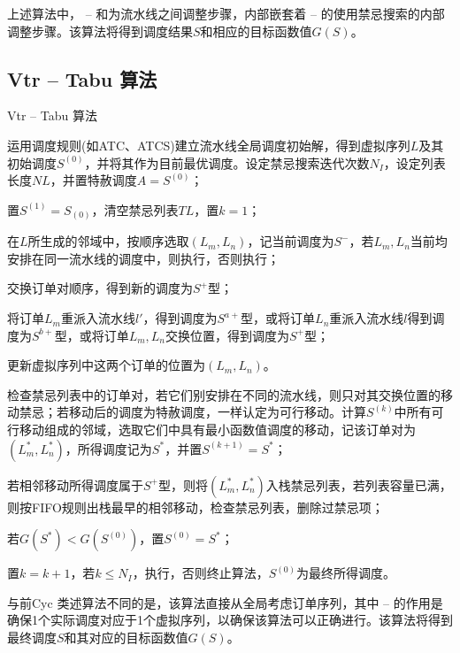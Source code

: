 上述算法中， --  和为流水线之间调整步骤，内部嵌套着 -- 的使用禁忌搜索的内部调整步骤。该算法将得到调度结果$S$和相应的目标函数值$G(S)$。
\subsection{Vtr -- Tabu 算法}
\begin{algori}
Vtr -- Tabu 算法\label{alg:vtrtabu}
\begin{asparaenum}
\renewcommand{\labelenumi}{\bf Step\theenumi~}
\item 运用调度规则(如ATC、ATCS)建立流水线全局调度初始解，得到虚拟序列$L$及其初始调度$S^{(0)}$，并将其作为目前最优调度。设定禁忌搜索迭代次数$N_I$，设定列表长度$NL$，并置特赦调度$A = S^{(0)}$；
\item 置$S^{(1)} = S_{(0)}$，清空禁忌列表$TL$，置$k = 1$；
\item 在$L$所生成的邻域中，按顺序选取$(L_m, L_n)$，记当前调度为$S^-$，若$L_m, L_n$当前均安排在同一流水线的调度中，则执行，否则执行；
\item 交换订单对顺序，得到新的调度为$S^+$型；
\item 将订单$L_m$重派入流水线$l'$，得到调度为$S^{a+}$型，或将订单$L_n$重派入流水线$l$得到调度为$S^{b+}$型，或将订单$L_m, L_n$交换位置，得到调度为$S^+$型；
\item 更新虚拟序列中这两个订单的位置为$(L_m, L_n)$。
\item 检查禁忌列表中的订单对，若它们别安排在不同的流水线，则只对其交换位置的移动禁忌；若移动后的调度为特赦调度，一样认定为可行移动。计算$S^{(k)}$中所有可行移动组成的邻域，选取它们中具有最小函数值调度的移动，记该订单对为$(L_m^*, L_n^*)$，所得调度记为$S^*$，并置$S^{(k+1)} = S^*$；
\item 若相邻移动所得调度属于$S^+$型，则将$(L_m^*, L_n^*)$入栈禁忌列表，若列表容量已满，则按FIFO规则出栈最早的相邻移动，检查禁忌列表，删除过禁忌项；
\item 若$G(S^*) < G(S^{(0)})$，置$S^{(0)} = S^*$；
\item 置$k = k + 1$，若$k\le N_I$，执行，否则终止算法，$S^{(0)}$为最终所得调度。
\end{asparaenum}
\end{algori}

与前Cyc 类述算法不同的是，该算法直接从全局考虑订单序列，其中 -- 的作用是确保1个实际调度对应于1个虚拟序列，以确保该算法可以正确进行。该算法将得到最终调度$S$和其对应的目标函数值$G(S)$。 
